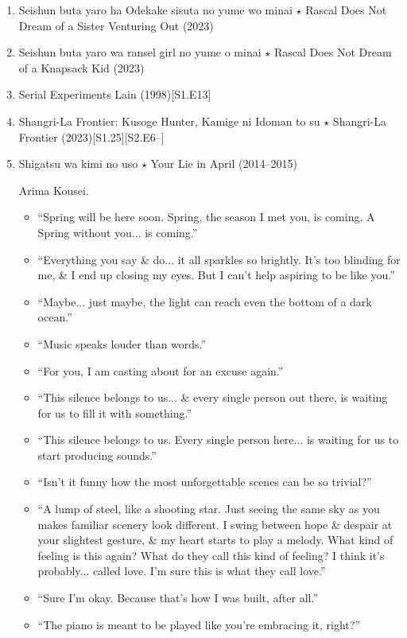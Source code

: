 \documentclass{article}
\begin{document}
\begin{enumerate}
    \item {\sc Seishun buta yaro ha Odekake sisuta no yume wo minai $\star$ Rascal Does Not Dream of a Sister Venturing Out} (2023)
    \item {\sc Seishun buta yaro wa ransel girl no yume o minai $\star$ Rascal Does Not Dream of a Knapsack Kid} (2023)
    \item {\sc Serial Experiments Lain} (1998)\hfill[S1.E13]
    \item {\sc Shangri-La Frontier: Kusoge Hunter, Kamige ni Idoman to su $\star$ Shangri-La Frontier} (2023)\hfill[S1.25][S2.E6--]
    \item {\sc Shigatsu wa kimi no uso $\star$ Your Lie in April} (2014--2015)
    
    {\sc Arima Kousei.}
    \begin{itemize}
    	\item ``Spring will be here soon. Spring, the season I met you, is coming. A Spring without you... is coming.''
    	\item ``Everything you say \& do... it all sparkles so brightly. It's too blinding for me, \& I end up closing my eyes. But I can't help aspiring to be like you.''
    	\item ``Maybe... just maybe, the light can reach even the bottom of a dark ocean.''
    	\item ``Music speaks louder than words.''
    	\item ``For you, I am casting about for an excuse again.''
    	\item ``This silence belongs to us... \& every single person out there, is waiting for us to fill it with something.''
    	\item ``This silence belongs to us. Every single person here... is waiting for us to start producing sounds.''
    	\item ``Isn't it funny how the most unforgettable scenes can be so trivial?''
    	\item ``A lump of steel, like a shooting star. Just seeing the same sky as you makes familiar scenery look different. I swing between hope \& despair at your slightest gesture, \& my heart starts to play a melody. What kind of feeling is this again? What do they call this kind of feeling? I think it's probably... called love. I'm sure this is what they call love.''
    	\item ``Sure I'm okay. Because that's how I was built, after all.''
    	\item ``The piano is meant to be played like you're embracing it, right?''

\end{itemize}
\end{enumerate}
\end{document}
